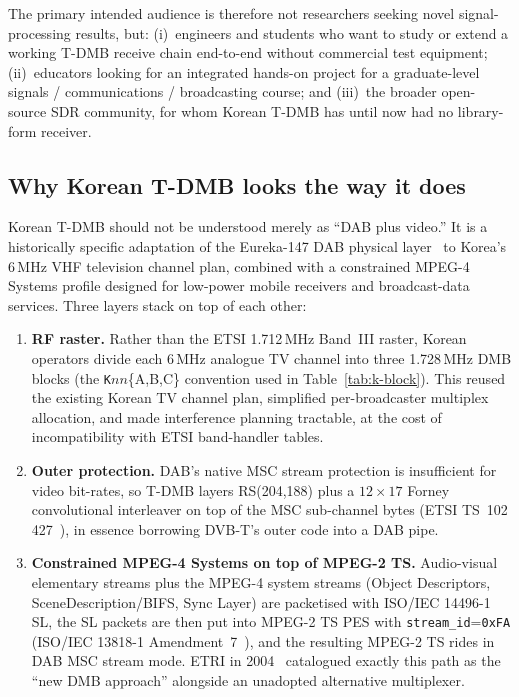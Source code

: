 \documentclass[11pt,a4paper]{article}
\begin{document}
The primary intended audience is therefore not researchers
seeking novel signal-processing results, but: (i)~engineers and
students who want to study or extend a working T-DMB receive
chain end-to-end without commercial test equipment;
(ii)~educators looking for an integrated hands-on project for a
graduate-level signals / communications / broadcasting course;
and (iii)~the broader open-source SDR community, for whom Korean
T-DMB has until now had no library-form receiver.

\subsection{Why Korean T-DMB looks the way it does}\label{sec:why}

Korean T-DMB should not be understood merely as ``DAB plus
video.''  It is a historically specific adaptation of the
Eureka-147 DAB physical layer~\cite{etsi300401} to Korea's
6\,MHz VHF television channel plan, combined with a constrained
MPEG-4 Systems profile designed for low-power mobile receivers
and broadcast-data services.  Three layers stack on top of
each other:

\begin{enumerate}[leftmargin=*,nosep]
\item \textbf{RF raster.}  Rather than the ETSI 1.712\,MHz
      Band~III raster, Korean operators divide each 6\,MHz
      analogue TV channel into three 1.728\,MHz DMB blocks
      (the \texttt{K}$nn$\{A,B,C\} convention used in
      Table~\ref{tab:k-block}).  This reused the existing
      Korean TV channel plan, simplified per-broadcaster
      multiplex allocation, and made interference planning
      tractable, at the cost of incompatibility with ETSI
      band-handler tables.
\item \textbf{Outer protection.}  DAB's native MSC stream
      protection is insufficient for video bit-rates, so
      T-DMB layers RS(204,188) plus a $12{\times}17$ Forney
      convolutional interleaver on top of the MSC sub-channel
      bytes (ETSI TS~102\,427~\cite{etsi102427}), in essence
      borrowing DVB-T's outer code into a DAB pipe.
\item \textbf{Constrained MPEG-4 Systems on top of MPEG-2 TS.}
      Audio-visual elementary streams plus the MPEG-4 system
      streams (Object Descriptors, SceneDescription/BIFS,
      Sync Layer) are packetised with ISO/IEC 14496-1 SL, the
      SL packets are then put into MPEG-2 TS PES with
      \texttt{stream\_id}=\texttt{0xFA} (ISO/IEC 13818-1
      Amendment~7~\cite{iso13818-1-amd7}), and the resulting
      MPEG-2 TS rides in DAB MSC stream mode.  ETRI in
      2004~\cite{lee2004m4smux} catalogued exactly this path
      as the ``new DMB approach'' alongside an unadopted
      alternative multiplexer.
\end{enumerate}
\end{document}

